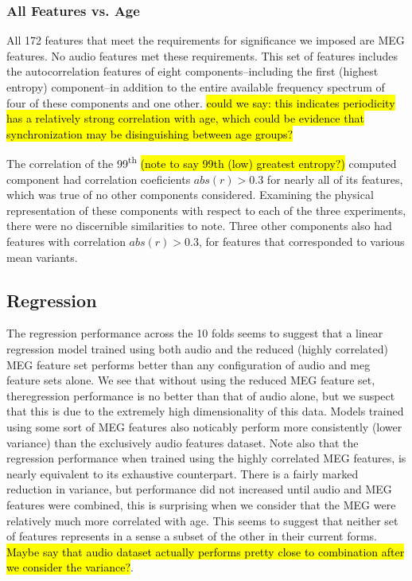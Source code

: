 \documentclass[a4paper]{article}
\newcommand{\DK}[1]{{\small \textcolor{blue}{\hl{#1}}}}
\begin{document}
\subsubsection{All Features vs. Age}

All 172 features that meet the requirements for significance we imposed are MEG features. No audio features met these requirements. This set of features includes the autocorrelation features of eight components--including the first (highest entropy) component--in addition to the entire available frequency spectrum of four of these components and one other. \DK{could we say: this indicates periodicity has a relatively strong correlation with age, which could be evidence that synchronization may be disinguishing between age groups?}

The correlation of the 99\textsuperscript{th} \DK{(note to say 99th (low) greatest entropy?)} computed component had correlation coeficients $abs(r)>0.3$ for nearly all of its features, which was true of no other components considered. Examining the physical representation of these components with respect to each of the three experiments, there were no discernible similarities to note. Three other components also had features with correlation $abs(r)>0.3$, for features that corresponded to various mean variants.

\subsection{Regression}

The regression performance across the 10 folds seems to suggest that a linear regression model trained using both audio and the reduced (highly correlated) MEG feature set performs better than any configuration of audio and meg feature sets alone. We see that without using the reduced MEG feature set, theregression performance is no better than that of audio alone, but we suspect that this is due to the extremely high dimensionality of this data. Models trained using some sort of MEG features also noticably perform more consistently (lower variance) than the exclusively audio features dataset.
Note also that the regression performance when trained using the highly correlated MEG features, is nearly equivalent to its exhaustive counterpart. There is a fairly marked reduction in variance, but performance did not increased until audio and MEG features were combined, this is surprising when we consider that the MEG were relatively much more correlated with age. This seems to suggest that neither set of features represents in a sense a subset of the other in their current forms. \DK{Maybe say that audio dataset actually performs pretty close to combination after we consider the variance?}. 
\end{document}
